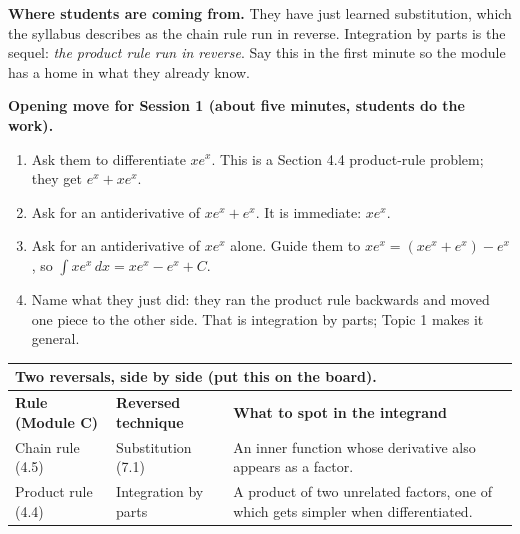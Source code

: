 \documentclass[11pt]{article}
\begin{document}
\begin{bridgebox}
\textbf{Where students are coming from.} They have just learned substitution, which the syllabus describes as the chain rule run in reverse. Integration by parts is the sequel: \emph{the product rule run in reverse}. Say this in the first minute so the module has a home in what they already know.

\textbf{Opening move for Session 1 (about five minutes, students do the work).}
\begin{enumerate}
\item Ask them to differentiate $xe^x$. This is a Section 4.4 product-rule problem; they get $e^x + xe^x$.
\item Ask for an antiderivative of $xe^x + e^x$. It is immediate: $xe^x$.
\item Ask for an antiderivative of $xe^x$ alone. Guide them to $xe^x = (xe^x+e^x) - e^x$, so $\int xe^x\,dx = xe^x - e^x + C$.
\item Name what they just did: they ran the product rule backwards and moved one piece to the other side. That is integration by parts; Topic 1 makes it general.
\end{enumerate}

\begin{tabular}{p{3.4cm}p{4.0cm}p{6.0cm}}
\multicolumn{3}{l}{\textbf{Two reversals, side by side (put this on the board).}} \\[4pt]
\toprule
\textbf{Rule (Module C)} & \textbf{Reversed technique} & \textbf{What to spot in the integrand} \\
\midrule
Chain rule (4.5) & Substitution (7.1) & An inner function whose derivative also appears as a factor. \\
Product rule (4.4) & Integration by parts & A product of two unrelated factors, one of which gets simpler when differentiated. \\
\bottomrule
\end{tabular}


\end{bridgebox}
\end{document}
